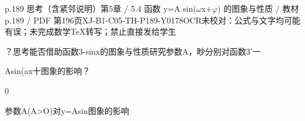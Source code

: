 \begin{bankitem}{p.189 思考（含紧邻说明）}{第5章 / 5.4 函数 y=A sin(\ensuremath{\omega}x+\ensuremath{\varphi}) 的图象与性质 / 教材 p.189 / PDF 第196页}{XJ-B1-C05-TH-P189-Y0178}{OCR未校对：公式与文字均可能有误；未完成数学TeX转写；禁止直接发给学生}
\begin{ocrdraft}
\par
？思考能否借助函数3-sinx的图象与性质研究参数A，眇分别对函数3'一
\par
Asin(ax十图象的影响？
\par
0
\par
参数A(A>O)对y=Asin图象的影响
\end{ocrdraft}
\end{bankitem}
